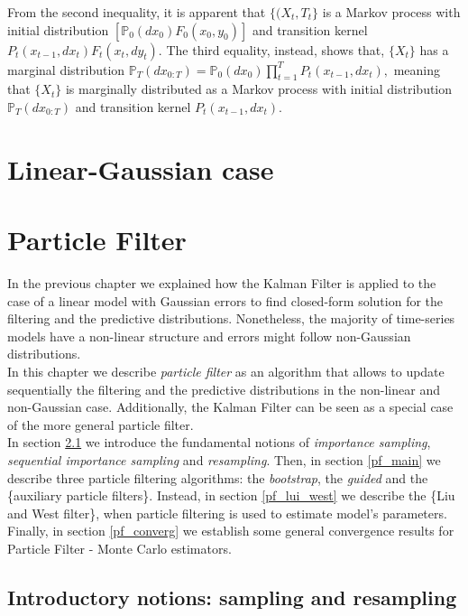 \documentclass[
]{book}
\theoremstyle{break}
\theoremstyle{nonumberplain}
\begin{document}
From the second inequality, it is apparent that \(\{(X_t,T_t\}\) is a
Markov process with initial distribution
\([\mathbb{P}_0(dx_0)F_0(x_0,y_0)]\) and transition kernel
\(P_t(x_{t-1},dx_t)F_t(x_t,dy_t).\) The third equality, instead, shows
that, \(\{X_t\}\) has a marginal distribution
\(\mathbb{P}_T(dx_{0:T})=\mathbb{P}_0(dx_0)\prod_{t=1}^T P_t(x_{t-1},dx_t),\)
meaning that \(\{X_t\}\) is marginally distributed as a Markov process
with initial distribution \(\mathbb{P}_T(dx_{0:T})\) and transition
kernel \(P_t(x_{t-1},dx_t).\)

\chapter{Linear-Gaussian case}

\chapter{Particle Filter}

In the previous chapter we explained how the Kalman Filter is applied to
the case of a linear model with Gaussian errors to find closed-form
solution for the filtering and the predictive distributions.
Nonetheless, the majority of time-series models have a non-linear
structure and errors might follow non-Gaussian distributions.\\
In this chapter we describe \textit{particle filter} as an algorithm
that allows to update sequentially the filtering and the predictive
distributions in the non-linear and non-Gaussian case. Additionally, the
Kalman Filter can be seen as a special case of the more general particle
filter.\\
In section \ref{pf_intro} we introduce the fundamental notions of
\textit{importance sampling}, \textit{sequential importance sampling}
and \textit{resampling}. Then, in section \ref{pf_main} we describe
three particle filtering algorithms: the \textit{bootstrap}, the
\textit{guided} and the \{auxiliary particle filters\}. Instead, in
section \ref{pf_lui_west} we describe the \{Liu and West filter\}, when
particle filtering is used to estimate model's parameters. Finally, in
section \ref{pf_converg} we establish some general convergence results
for Particle Filter - Monte Carlo estimators.

\section{Introductory notions: sampling and resampling}\label{pf_intro}
\end{document}
